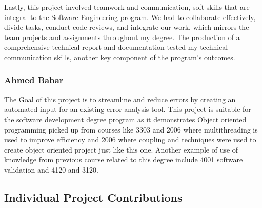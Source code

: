 Lastly, this project involved teamwork and communication, soft skills that are integral to the Software Engineering program. We had to collaborate effectively, divide tasks, conduct code reviews, and integrate our work, which mirrors the team projects and assignments throughout my degree. The production of a comprehensive technical report and documentation tested my technical communication skills, another key component of the program’s outcomes.


\subsubsection{Ahmed Babar}\label{subsubsec:ahmed-deg}
The Goal of this project is to streamline and reduce errors by creating an automated input for an existing error analysis tool. This project is suitable for the software development degree program as it demonstrates Object oriented programming picked up from courses like 3303 and 2006 where multithreading is used to improve efficiency and 2006 where coupling and techniques were used to create object oriented project just like this one. Another example of use of knowledge from previous course related to this degree include 4001 software validation and 4120 and 3120.

\subsection{Individual Project Contributions}\label{subsec:individual-project-contributions}
